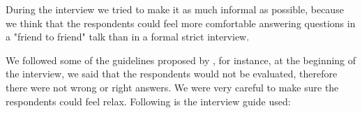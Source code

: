 
During the interview we tried to make it as much informal as possible, because we think that the respondents could feel more comfortable answering questions in a "friend to friend" talk than in a formal strict interview.

We followed some of the guidelines proposed by \cite{Seaman:1999}, for instance, at the beginning of the interview, we said that the respondents would not be evaluated, therefore there were not wrong or right answers. We were very careful to make sure the respondents could feel relax. Following is the interview guide used:


